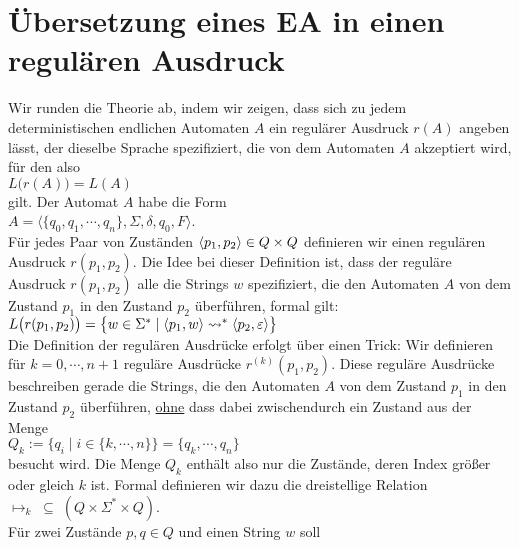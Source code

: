 \section{\"Ubersetzung eines \textsc{EA} in einen regul\"aren Ausdruck}
Wir runden die Theorie ab, indem wir zeigen, dass sich zu jedem deterministischen endlichen
Automaten $A$ ein regul\"arer Ausdruck $r(A)$ angeben l\"asst, der dieselbe Sprache spezifiziert,
die von dem Automaten $A$ akzeptiert wird, f\"ur den also
\\[0.2cm]
\hspace*{1.3cm}
$L\bigl(r(A)\bigr) = L(A)$
\\[0.2cm]
gilt.  Der  Automat $A$ habe die Form
\\[0.2cm]
\hspace*{1.3cm}
$A = \langle \{ q_0, q_1, \cdots, q_n \}, \Sigma, \delta, q_0, F \rangle$.
\\[0.2cm]
F\"ur jedes Paar von Zust\"anden $\pair(p_1,p_2) \in Q \times Q$ definieren wir einen regul\"aren Ausdruck
$r(p_1, p_2)$.   Die Idee bei dieser Definition ist, dass der regul\"are Ausdruck
$r(p_1, p_2)$ alle die Strings $w$ spezifiziert, die den Automaten $A$ von dem Zustand
$p_1$ in den Zustand $p_2$ \"uberf\"uhren, formal gilt:
\\[0.2cm]
\hspace*{1.3cm}
$L\bigl(r(p_1, p_2)\bigr) = 
  \bigl\{ w \in \Sigma^* \mid \pair(p_1,w) \leadsto^* \pair(p_2, \varepsilon) \bigr\}$
\\[0.2cm]  
Die Definition der regul\"aren Ausdr\"ucke erfolgt \"uber einen Trick: Wir definieren f\"ur
$k=0,\cdots,n+1$ regul\"are Ausdr\"ucke $r^{(k)}(p_1, p_2)$.   Diese regul\"are Ausdr\"ucke
beschreiben gerade die Strings, die den Automaten $A$ von dem Zustand
$p_1$ in den Zustand $p_2$ \"uberf\"uhren, \underline{ohne} dass dabei zwischendurch ein
Zustand aus der Menge 
\\[0.2cm]
\hspace*{1.3cm}
$Q_k := \bigl\{ q_i \mid i \in \{k,\cdots,n \}  \bigl\} = \{ q_k, \cdots, q_n \}$ 
\\[0.2cm]
besucht wird.  Die Menge $Q_k$ enth\"alt also nur die Zust\"ande, deren Index gr\"o{\ss}er oder
gleich $k$ ist.  Formal definieren wir dazu die dreistellige Relation 
\\[0.2cm]
\hspace*{1.3cm}
$\mapsto_k \;\subseteq\; (Q \times \Sigma^* \times Q)$.
\\[0.2cm]
F\"ur zwei Zust\"ande $p, q \in Q$ und einen String $w$ soll 
\\[0.2cm]
